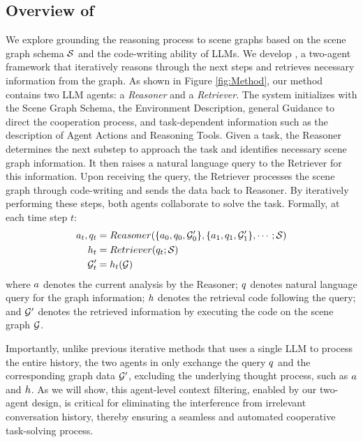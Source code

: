 \subsection{Overview of \RwR}
We explore grounding the reasoning process to scene graphs based on the scene graph schema ${\mathcal{S}}$ and the code-writing ability of LLMs.
We develop \RwR, a two-agent framework that iteratively reasons through the next steps and retrieves necessary information from the graph.
As shown in Figure \ref{fig:Method}, our method contains two LLM agents: a \textit{Reasoner} and a \textit{Retriever}. 
The system initializes with the Scene Graph Schema, the Environment Description, general Guidance to direct the cooperation process, and task-dependent information such as the description of Agent Actions and Reasoning Tools. 
Given a task, the Reasoner determines the next substep to approach the task and identifies necessary scene graph information. It then raises a natural language query to the Retriever for this information. Upon receiving the query, the Retriever processes the scene graph through code-writing and sends the data back to Reasoner. By iteratively performing these steps, both agents collaborate to solve the task. 
Formally, at each time step $t$:
\begin{align}
    a_t, q_t &= Reasoner(\{a_0, q_0, {\mathcal{G}}^\prime_0\}, \{a_{1}, q_{1}, {\mathcal{G}}^\prime_{1}\}, \cdots; {\mathcal{S}}) \\
    h_t &= Retriever(q_t; {\mathcal{S}}) \\
    {\mathcal{G}}^\prime_{t} &= h_t({\mathcal{G}})
\end{align}
where $a$ denotes the current analysis by the Reasoner; $q$ denotes natural language query for the graph information; $h$ denotes the retrieval code following the query; and ${\mathcal{G}}^\prime$ denotes the retrieved information by executing the code on the scene graph ${\mathcal{G}}$.

Importantly, unlike previous iterative methods \cite{react, iterRG} that uses a single LLM to process the entire history, the two agents in \RwR only exchange the query $q$ and the corresponding graph data ${\mathcal{G}}^\prime$, excluding the underlying thought process, such as $a$ and $h$. 
As we will show, this agent-level context filtering, enabled by our two-agent design, is critical for eliminating the interference from irrelevant conversation history, thereby ensuring a seamless and automated cooperative task-solving process.

